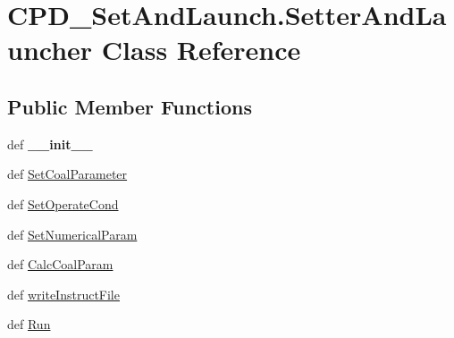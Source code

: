 \hypertarget{classCPD__SetAndLaunch_1_1SetterAndLauncher}{\section{\-C\-P\-D\-\_\-\-Set\-And\-Launch.\-Setter\-And\-Launcher \-Class \-Reference}
\label{classCPD__SetAndLaunch_1_1SetterAndLauncher}
}
\subsection*{\-Public \-Member \-Functions}
\begin{DoxyCompactItemize}
\item 
\hypertarget{classCPD__SetAndLaunch_1_1SetterAndLauncher_ac539dfac1aea5e88cb89734a053a60ee}{def {\bfseries \-\_\-\-\_\-init\-\_\-\-\_\-}}\label{classCPD__SetAndLaunch_1_1SetterAndLauncher_ac539dfac1aea5e88cb89734a053a60ee}

\item 
def \hyperlink{classCPD__SetAndLaunch_1_1SetterAndLauncher_a073f7b4cfc2934f466b9d28e8fde9631}{\-Set\-Coal\-Parameter}
\item 
def \hyperlink{classCPD__SetAndLaunch_1_1SetterAndLauncher_a52eafb95b653d98273018cd07040b91d}{\-Set\-Operate\-Cond}
\item 
def \hyperlink{classCPD__SetAndLaunch_1_1SetterAndLauncher_aa39a02e314ebe1159026f46129fd2cd3}{\-Set\-Numerical\-Param}
\item 
def \hyperlink{classCPD__SetAndLaunch_1_1SetterAndLauncher_a61f9e53fe585c4333f54d90ba695296a}{\-Calc\-Coal\-Param}
\item 
def \hyperlink{classCPD__SetAndLaunch_1_1SetterAndLauncher_a5a8778ca01279308c247acd8fe4ea792}{write\-Instruct\-File}
\item 
def \hyperlink{classCPD__SetAndLaunch_1_1SetterAndLauncher_a20441720dcc1e49eb140bffdf730e719}{\-Run}
\end{DoxyCompactItemize}
